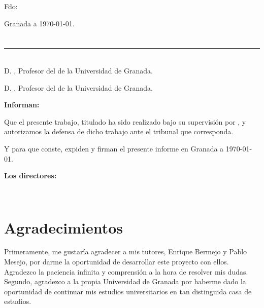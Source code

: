\vspace{6cm}

\noindent Fdo: \myName

\vspace{2cm}

\begin{flushright}
Granada a \today.
\end{flushright}


\chapter*{}
\thispagestyle{empty}

\noindent\rule[-1ex]{\textwidth}{2pt}\\[4.5ex]

D. \textbf{\myProf}, Profesor del \myDepartment de la Universidad de Granada.

\vspace{0.5cm}

D. \textbf{\myOtherProf}, Profesor del \myDepartment de la Universidad de Granada.


\vspace{0.5cm}

\textbf{Informan:}

\vspace{0.5cm}

Que el presente trabajo, titulado \textit{\textbf{\myTitle}}
ha sido realizado bajo su supervisión por \textbf{\myName}, y autorizamos la defensa de dicho trabajo ante el tribunal
que corresponda.

\vspace{0.5cm}

Y para que conste, expiden y firman el presente informe en Granada a \today.

\vspace{1cm}

\textbf{Los directores:}

\vspace{5cm}

\noindent \textbf{\myProf \ \ \ \ \ \myOtherProf}

\chapter*{Agradecimientos}

\thispagestyle{empty}
       \vspace{1cm}


Primeramente, me gustaría agradecer a mis tutores, Enrique Bermejo y Pablo Mesejo,
por darme la oportunidad de desarrollar este proyecto con ellos. 
Agradezco la paciencia infinita y comprensión a la hora de resolver mis dudas. 
Segundo, agradezco a la propia Universidad de Granada por haberme dado la oportunidad 
de continuar mis estudios universitarios en tan distinguida casa de estudios. 
\\
